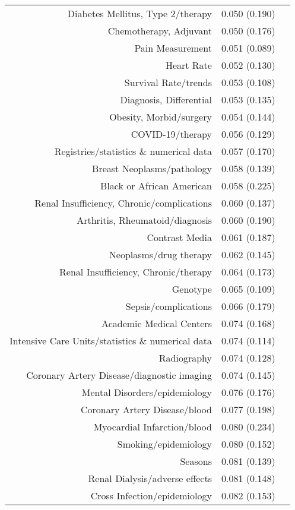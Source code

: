 \begin{longtable}[l]{rr@{}l@{ }}
Diabetes Mellitus, Type 2/therapy & 0.050 (0.190) & $^{}$\\
Chemotherapy, Adjuvant & 0.050 (0.176) & $^{}$\\
Pain Measurement & 0.051 (0.089) & $^{}$\\
Heart Rate & 0.052 (0.130) & $^{}$\\
Survival Rate/trends & 0.053 (0.108) & $^{}$\\
Diagnosis, Differential & 0.053 (0.135) & $^{}$\\
Obesity, Morbid/surgery & 0.054 (0.144) & $^{}$\\
COVID-19/therapy & 0.056 (0.129) & $^{}$\\
Registries/statistics \& numerical data & 0.057 (0.170) & $^{}$\\
Breast Neoplasms/pathology & 0.058 (0.139) & $^{}$\\
Black or African American & 0.058 (0.225) & $^{}$\\
Renal Insufficiency, Chronic/complications & 0.060 (0.137) & $^{}$\\
Arthritis, Rheumatoid/diagnosis & 0.060 (0.190) & $^{}$\\
Contrast Media & 0.061 (0.187) & $^{}$\\
Neoplasms/drug therapy & 0.062 (0.145) & $^{}$\\
Renal Insufficiency, Chronic/therapy & 0.064 (0.173) & $^{}$\\
Genotype & 0.065 (0.109) & $^{}$\\
Sepsis/complications & 0.066 (0.179) & $^{}$\\
Academic Medical Centers & 0.074 (0.168) & $^{}$\\
Intensive Care Units/statistics \& numerical data & 0.074 (0.114) & $^{}$\\
Radiography & 0.074 (0.128) & $^{}$\\
Coronary Artery Disease/diagnostic imaging & 0.074 (0.145) & $^{}$\\
Mental Disorders/epidemiology & 0.076 (0.176) & $^{}$\\
Coronary Artery Disease/blood & 0.077 (0.198) & $^{}$\\
Myocardial Infarction/blood & 0.080 (0.234) & $^{}$\\
Smoking/epidemiology & 0.080 (0.152) & $^{}$\\
Seasons & 0.081 (0.139) & $^{}$\\
Renal Dialysis/adverse effects & 0.081 (0.148) & $^{}$\\
Cross Infection/epidemiology & 0.082 (0.153) & $^{}$\\

\end{longtable}
